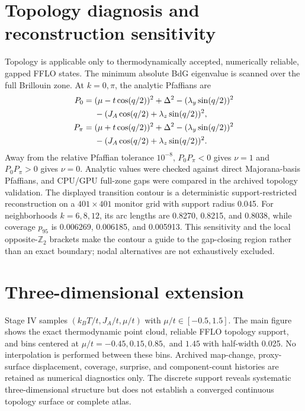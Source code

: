 \section{Topology diagnosis and reconstruction sensitivity}\label{sec:topology}
Topology is applicable only to thermodynamically accepted, numerically reliable, gapped FFLO states.  The minimum absolute BdG eigenvalue is scanned over the full Brillouin zone.  At $k=0,\pi$, the analytic Pfaffians are
\begin{align}P_0={}&(\mu-t\cos(q/2))^2+\Delta^2-(\lambda_y\sin(q/2))^2\notag\\ &-(J_A\cos(q/2)+\lambda_z\sin(q/2))^2,\\ P_\pi={}&(\mu+t\cos(q/2))^2+\Delta^2-(\lambda_y\sin(q/2))^2\notag\\ &-(J_A\cos(q/2)+\lambda_z\sin(q/2))^2.\end{align}
Away from the relative Pfaffian tolerance $10^{-8}$, $P_0P_\pi<0$ gives $\nu=1$ and $P_0P_\pi>0$ gives $\nu=0$. Analytic values were checked against direct Majorana-basis Pfaffians, and CPU/GPU full-zone gaps were compared in the archived topology validation. The displayed transition contour is a deterministic support-restricted reconstruction on a $401\times401$ monitor grid with support radius 0.045.  For neighborhoods $k=6,8,12$, its arc lengths are 0.8270, 0.8215, and 0.8038, while coverage $p_{95}$ is 0.006269, 0.006185, and 0.005913. This sensitivity and the local opposite-$\mathbb Z_2$ brackets make the contour a guide to the gap-closing region rather than an exact boundary; nodal alternatives are not exhaustively excluded.

\section{Three-dimensional extension}\label{sec:3d}
Stage IV samples $(k_BT/t,J_A/t,\mu/t)$ with $\mu/t\in[-0.5,1.5]$. The main figure shows the exact thermodynamic point cloud, reliable FFLO topology support, and bins centered at $\mu/t=-0.45,0.15,0.85,$ and $1.45$ with half-width 0.025. No interpolation is performed between these bins. Archived map-change, proxy-surface displacement, coverage, surprise, and component-count histories are retained as numerical diagnostics only. The discrete support reveals systematic three-dimensional structure but does not establish a converged continuous topology surface or complete atlas.


